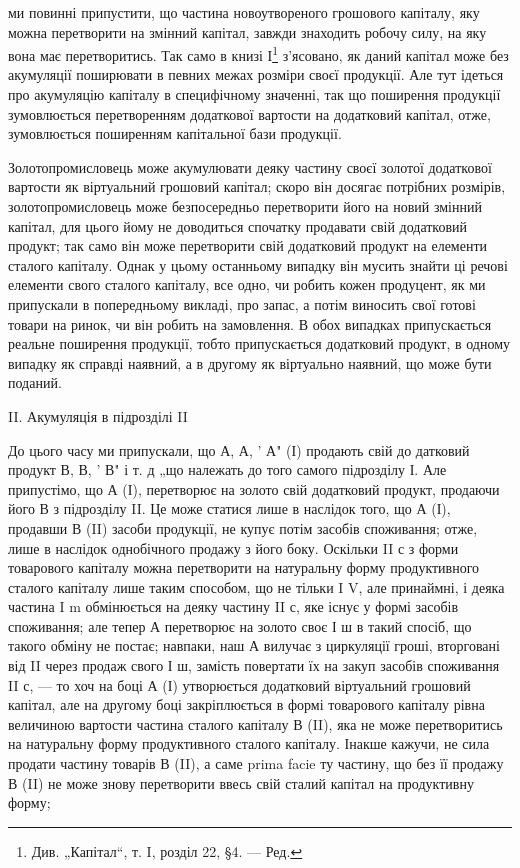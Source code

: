 ми повинні припустити, що частина новоутвореного грошового капіталу,
яку можна перетворити на змінний капітал, завжди знаходить робочу
силу, на яку вона має перетворитись. Так само в книзі І\footnote*{
Див. „Капітал“, т. I, розділ 22, §4. — Ред.
} з’ясовано,
як даний капітал може без акумуляції поширювати в певних межах розміри
своєї продукції. Але тут ідеться про акумуляцію капіталу в специфічному
значенні, так що поширення продукції зумовлюється перетворенням
додаткової вартости на додатковий капітал, отже, зумовлюється
поширенням капітальної бази продукції.

Золотопромисловець може акумулювати деяку частину своєї золотої
додаткової вартости як віртуальний грошовий капітал; скоро він досягає
потрібних розмірів, золотопромисловець може безпосередньо перетворити
його на новий змінний капітал, для цього йому не доводиться спочатку
продавати свій додатковий продукт; так само він може перетворити свій
додатковий продукт на елементи сталого капіталу. Однак у цьому останньому
випадку він мусить знайти ці речові елементи свого сталого капіталу,
все одно, чи робить кожен продуцент, як ми припускали в попередньому
викладі, про запас, а потім виносить свої готові товари на ринок,
чи він робить на замовлення. В обох випадках припускається реальне
поширення продукції, тобто припускається додатковий продукт, в
одному випадку як справді наявний, а в другому як віртуально наявний,
що може бути поданий.

II. Акумуляція в підрозділі II

До цього часу ми припускали, що А, А, ' А" (І) продають свій до
датковий продукт В, В, ' В" і т. д „що належать до того самого підрозділу
І. Але припустімо, що А (І), перетворює на золото свій додатковий
продукт, продаючи його В з підрозділу II. Це може статися
лише в наслідок того, що А (І), продавши В (II) засоби продукції,
не купує потім засобів споживання; отже, лише в наслідок однобічного
продажу з його боку. Оскільки II с з форми товарового капіталу можна
перетворити на натуральну форму продуктивного сталого капіталу лише
таким способом, що не тільки I V, але принаймні, і деяка частина I m
обмінюється на деяку частину II с, яке існує у формі засобів споживання;
але тепер А перетворює на золото своє І ш в такий спосіб, що такого
обміну не постає; навпаки, наш А вилучає з циркуляції гроші, вторговані
від II через продаж свого І ш, замість повертати їх на закуп засобів
споживання II с, — то хоч на боці А (І) утворюється додатковий
віртуальний грошовий капітал, але на другому боці закріплюється в формі
товарового капіталу рівна величиною вартости частина сталого капіталу
В (II), яка не може перетворитись на натуральну форму продуктивного
сталого капіталу. Інакше кажучи, не сила продати частину товарів
В (II), а саме prima facie ту частину, що без її продажу В (II) не може
знову перетворити ввесь свій сталий капітал на продуктивну форму;